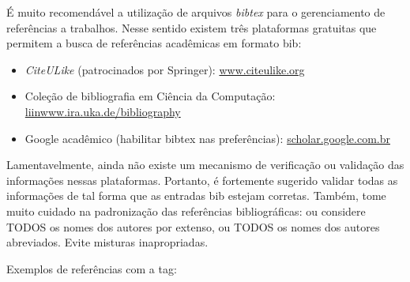 É muito recomendável a utilização de arquivos \emph{bibtex} para o gerenciamento
de referências a trabalhos. Nesse sentido existem três plataformas gratuitas
que permitem a busca de referências acadêmicas em formato bib: 
\begin{itemize}
	\item \emph{CiteULike} (patrocinados por Springer): \url{www.citeulike.org}
	\item Coleção de bibliografia em Ciência da Computação: \url{liinwww.ira.uka.de/bibliography}
	\item Google acadêmico (habilitar bibtex nas preferências): \url{scholar.google.com.br}
\end{itemize}
Lamentavelmente, ainda não existe um mecanismo de verificação ou validação das
informações nessas plataformas. Portanto, é fortemente sugerido validar todas
as informações de tal forma que as entradas bib estejam corretas.  Também, tome
muito cuidado na padronização das referências bibliográficas: ou considere TODOS
os nomes dos autores por extenso, ou TODOS os nomes dos autores abreviados.
Evite misturas inapropriadas.

Exemplos de referências com a tag:
